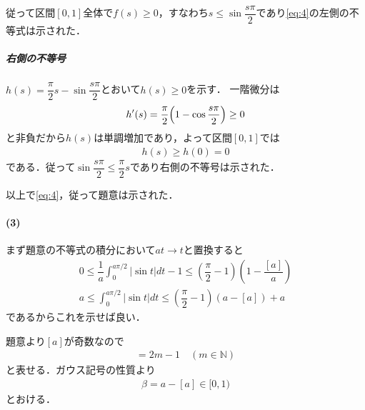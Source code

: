 \documentclass[../../main.tex]{subfiles}
\begin{document}
従って区間$[0,1]$全体で$f(s)\ge0$，すなわち$s\le\sin\dfrac{s\pi}{2}$であり\cref{eq:4}の左側の不等式は示された．

\subparagraph{右側の不等号}

$h(s)=\dfrac{\pi}{2}s-\sin\dfrac{s\pi}{2}$とおいて$h(s) \ge 0$を示す．
一階微分は
\begin{align}
  h'(s)=\dfrac{\pi}{2}\Bigl(1-\cos\dfrac{s\pi}{2}\Bigr)\ge0
\end{align}
と非負だから$h(s)$は単調増加であり，よって区間$[0,1]$では
\begin{align}
  h(s)\ge h(0)=0
\end{align}
である．従って$\sin\dfrac{s\pi}{2}\le\dfrac{\pi}{2}s$であり右側の不等号は示された．
\casesend

以上で\cref{eq:4}，従って題意は示された．

\paragraph{(3)}

まず題意の不等式の積分において$at\to t$と置換すると
\begin{align}
  0 \le \dfrac{1}{a}\int_{0}^{a\pi/2}|\sin t| dt - 1 \le \left(\dfrac{\pi}{2}-1\right)\left(1-\dfrac{[a]}{a}\right) \\
  a \le \int_{0}^{a\pi/2}|\sin t| dt \le \left(\dfrac{\pi}{2}-1\right)\left(a-[a]\right)+a \label{eq:5}
\end{align}
であるからこれを示せば良い．

題意より$[a]$が奇数なので
\begin{align}
  [a]=2m-1 \quad (m\in\mathbb N) \label{eq:6}
\end{align}
と表せる．ガウス記号の性質より
\begin{align}
  \beta=a-[a]\in[0,1) \label{eq:7}
\end{align}
とおける．
\end{document}
